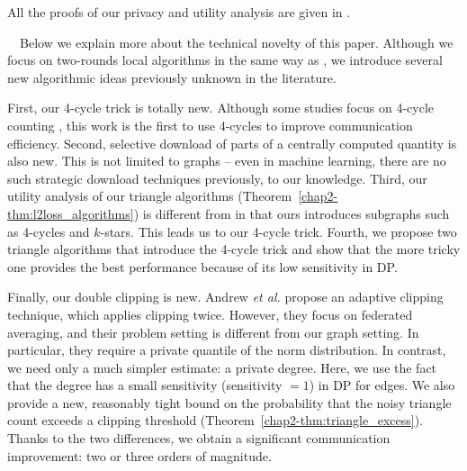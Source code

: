 All the proofs of our privacy and utility analysis 
are given in .

\smallskip
{}~~Below we explain more about 
the technical novelty of this paper. 
Although we focus on two-rounds local algorithms in the same way as \cite{Imola_USENIX21}, we introduce several new algorithmic ideas previously unknown in the literature. 

First, our 4-cycle trick is totally new. 
Although some studies focus on 4-cycle counting \cite{Bera_STACS17,Kallaugher_PODS19,Manjunath_ESA11,McGregor_PODS20}, this work is the first to use 4-cycles to improve communication efficiency. 
Second, selective download of parts of a centrally computed quantity is also new. 
This is not limited to graphs -- even in machine learning, 
there are no such strategic download techniques previously, to our knowledge. 
Third, our utility analysis of our 
triangle 
algorithms (Theorem~\ref{chap2-thm:l2loss_algorithms}) is 
different from \cite{Imola_USENIX21} in that ours introduces subgraphs such as 4-cycles and $k$-stars. 
This leads us to our 4-cycle trick. 
Fourth, we propose two triangle algorithms that introduce the 4-cycle trick and show that the more tricky one provides the best performance because of 
its low sensitivity in DP.

Finally, 
our double clipping is new. 
Andrew \textit{et al.} \cite{Andrew_NeurIPS21} propose an adaptive clipping technique, which applies clipping twice. 
However, they focus on federated averaging, 
and their problem setting is different from our graph setting. 
In particular, they require a private quantile of the norm distribution. 
In contrast, we need only a much simpler estimate: a private degree. 
Here, we use the fact that the degree has a small sensitivity (sensitivity $=1$) in DP for edges. 
We also provide a new, reasonably tight bound on the probability that the noisy triangle count exceeds a clipping threshold (Theorem~\ref{chap2-thm:triangle_excess}). 
Thanks to the two differences, we obtain a significant communication improvement: two or three orders of magnitude. 

